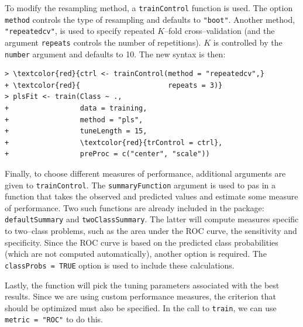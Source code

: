 \documentclass[12pt]{article}
\newcommand{\code}[1]{\mbox{\footnotesize\color{darkblue}\texttt{#1}}}
\begin{document}
To modify the resampling method, a \code{trainControl} function is used. The option \code{method} controls the type of resampling and defaults to \code{"boot"}. Another method, \code{"repeatedcv"}, is used to specify repeated $K$--fold cross--validation (and the argument \code{repeats} controls the number of repetitions). $K$ is controlled by the \code{number} argument and defaults to 10. The new syntax is then:
\begin{Verbatim}[fontshape=sl,formatcom=\color{darkblue},fontsize=\footnotesize,commandchars=\\\{\}]
> \textcolor{red}{ctrl <- trainControl(method = "repeatedcv",}
+ \textcolor{red}{                     repeats = 3)}
> plsFit <- train(Class ~ ., 
+                 data = training,
+                 method = "pls",
+                 tuneLength = 15,
+                 \textcolor{red}{trControl = ctrl},
+                 preProc = c("center", "scale"))                     
\end{Verbatim}
Finally, to choose different measures of performance, additional arguments are given to \code{trainControl}. The \code{summaryFunction} argument is used to pas in a function that takes the observed and predicted values and estimate some measure of performance. Two such functions are already included in the package: \code{defaultSummary} and \code{twoClassSummary}. The latter will compute measures specific to two--class problems, such as the area under the ROC curve, the sensitivity and specificity. Since the ROC curve is based on the predicted class probabilities (which are not computed automatically), another option is required. The \code{classProbs = TRUE} option is used to include these calculations. 

Lastly, the function will pick the tuning parameters associated with the best results. Since we are using custom performance measures, the criterion that should be optimized must also be specified. In the call to \code{train}, we can use \code{metric = "ROC"} to do this.
\end{document}
